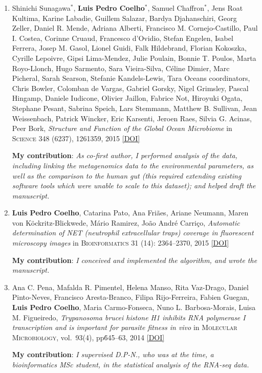 \documentclass{article}
\newcommand\showdoi[1]{%
    \href{http://dx.doi.org/#1}{[DOI]}%
}
\newcommand\pubname[1]{\textsc{#1}}
\newcommand\contribution[1]{\relax\hfill\break\textbf{My contribution}: \textit{#1}}
\newcommand\costar{${}^{*}$}
\begin{document}
\begin{enumerate}[resume]
\item Shinichi Sunagawa\costar, \textbf{Luis Pedro Coelho}\costar, Samuel
Chaffron\costar, Jens Roat Kultima, Karine Labadie, Guillem Salazar, Bardya
Djahanschiri, Georg Zeller, Daniel R. Mende, Adriana Alberti, Francisco M.
Cornejo-Castillo, Paul I. Costea, Corinne Cruaud, Francesco d'Ovidio, Stefan
Engelen, Isabel Ferrera, Josep M. Gasol, Lionel Guidi, Falk Hildebrand, Florian
Kokoszka, Cyrille Lepoivre, Gipsi Lima-Mendez, Julie Poulain, Bonnie T. Poulos,
Marta Royo-Llonch, Hugo Sarmento, Sara Vieira-Silva, Céline Dimier, Marc
Picheral, Sarah Searson, Stefanie Kandels-Lewis, Tara Oceans coordinators,
Chris Bowler, Colomban de Vargas, Gabriel Gorsky, Nigel Grimsley, Pascal
Hingamp, Daniele Iudicone, Olivier Jaillon, Fabrice Not, Hiroyuki Ogata,
Stephane Pesant, Sabrina Speich, Lars Stemmann, Matthew B. Sullivan, Jean
Weissenbach, Patrick Wincker, Eric Karsenti, Jeroen Raes, Silvia G. Acinas,
Peer Bork, \emph{Structure and Function of the Global Ocean Microbiome} in
\pubname{Science} 348 (6237), 1261359, 2015 \showdoi{10.1126/science.1261359}
\contribution{As co-first author, I performed analysis of the data, including
linking the metagenomics data to the environmental parameters, as well as the
comparison to the human gut (this required extending existing software tools
which were unable to scale to this dataset); and helped draft the manuscript.}

\item \textbf{Luis Pedro Coelho}, Catarina Pato, Ana Friães, Ariane Neumann,
Maren von Köckritz-Blickwede, Mário Ramirez, João André Carriço,
\emph{Automatic determination of NET (neutrophil extracellular traps) coverage
in fluorescent microscopy images} in \pubname{Bioinformatics} 31 (14):
2364--2370, 2015 \showdoi{10.1093/bioinformatics/btv156}
\contribution{I conceived and implemented the algorithm, and wrote the
manuscript.}

\item Ana C. Pena, Mafalda R. Pimentel, Helena Manso, Rita Vaz-Drago, Daniel
Pinto-Neves, Francisco Aresta-Branco, Filipa Rijo-Ferreira, Fabien Guegan,
\textbf{Luis Pedro Coelho}, Maria Carmo-Fonseca, Nuno L. Barbosa-Morais, Luisa
M. Figueiredo, \emph{Trypanosoma brucei histone H1 inhibits RNA polymerase I
transcription and is important for parasite fitness in vivo} in
\pubname{Molecular Microbiology}, vol.\ 93(4), pp\. 645--63, 2014
\showdoi{10.1111/mmi.12677}
\contribution{I supervised D.P-N., who was at the time, a bioinformatics MSc
student, in the statistical analysis of the RNA-seq data.}


\end{enumerate}
\end{document}
